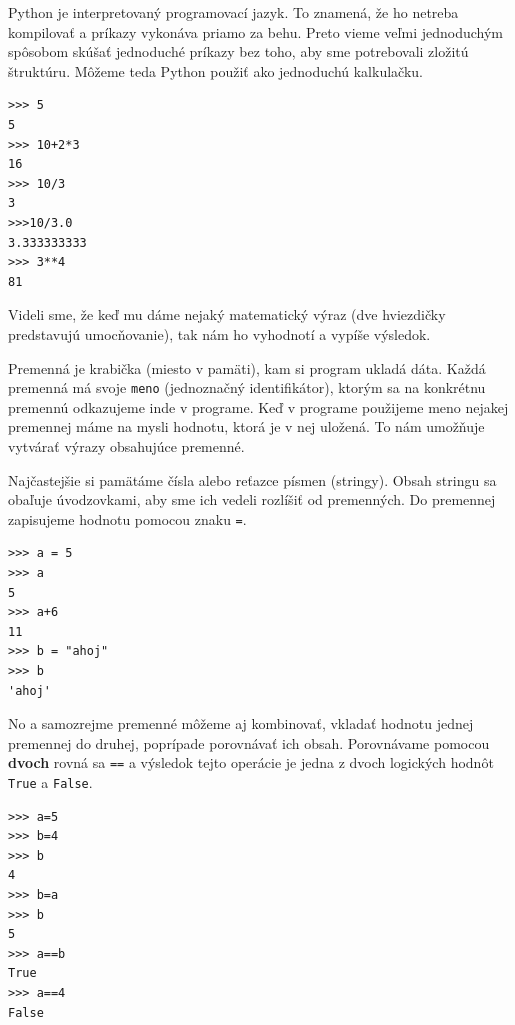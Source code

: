 




Python je interpretovaný programovací jazyk. To znamená, že ho netreba kompilovať a príkazy vykonáva priamo za behu.
Preto vieme veľmi jednoduchým spôsobom skúšať jednoduché príkazy bez toho, aby sme potrebovali zložitú štruktúru.
Môžeme teda Python použiť ako jednoduchú kalkulačku.

\begin{lstlisting}
>>> 5
5
>>> 10+2*3
16
>>> 10/3
3
>>>10/3.0
3.333333333
>>> 3**4
81
\end{lstlisting}

Videli sme, že keď mu dáme nejaký matematický výraz (dve hviezdičky predstavujú umocňovanie), tak nám ho
vyhodnotí a vypíše výsledok.


Premenná je krabička (miesto v pamäti), kam si program ukladá dáta. Každá premenná má svoje \texttt{meno} (jednoznačný
identifikátor), ktorým sa na konkrétnu premennú odkazujeme inde v programe. Keď v programe použijeme meno nejakej premennej
máme na mysli hodnotu, ktorá je v nej uložená. To nám umožňuje vytvárať výrazy obsahujúce premenné.

Najčastejšie si pamätáme čísla alebo reťazce písmen (stringy). Obsah stringu sa obaľuje úvodzovkami, aby sme ich vedeli rozlíšiť
od premenných. Do premennej zapisujeme hodnotu pomocou znaku \texttt{=}.

\begin{lstlisting}
>>> a = 5
>>> a
5
>>> a+6
11
>>> b = "ahoj"
>>> b
'ahoj'
\end{lstlisting}

No a samozrejme premenné môžeme aj kombinovať, vkladať hodnotu jednej premennej do druhej, poprípade porovnávať ich obsah.
Porovnávame pomocou \textbf{dvoch} rovná sa \texttt{==} a výsledok tejto operácie je jedna z dvoch logických hodnôt \texttt{True}
a \texttt{False}.

\begin{lstlisting}
>>> a=5
>>> b=4
>>> b
4
>>> b=a
>>> b
5
>>> a==b
True
>>> a==4
False
\end{lstlisting}

